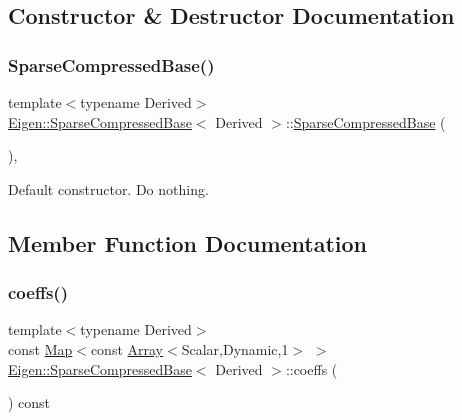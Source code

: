 \subsection{Constructor \& Destructor Documentation}
\mbox{\label{class_eigen_1_1_sparse_compressed_base_af79f020db965367d97eb954fc68d8f99}} 
\subsubsection{\texorpdfstring{SparseCompressedBase()}{SparseCompressedBase()}}
{\footnotesize\ttfamily template$<$typename Derived$>$ \\
\mbox{\hyperlink{class_eigen_1_1_sparse_compressed_base}{Eigen\+::\+Sparse\+Compressed\+Base}}$<$ Derived $>$\+::\mbox{\hyperlink{class_eigen_1_1_sparse_compressed_base}{Sparse\+Compressed\+Base}} (\begin{DoxyParamCaption}{ }\end{DoxyParamCaption})\hspace{0.3cm}{\ttfamily [inline]}, {\ttfamily [protected]}}

Default constructor. Do nothing. 

\subsection{Member Function Documentation}
\mbox{\label{class_eigen_1_1_sparse_compressed_base_a101b155485ae59ea1261c4f6040f3dc4}} 
\subsubsection{\texorpdfstring{coeffs()}{coeffs()}\hspace{0.1cm}{\footnotesize\ttfamily [1/2]}}
{\footnotesize\ttfamily template$<$typename Derived$>$ \\
const \mbox{\hyperlink{class_eigen_1_1_map}{Map}}$<$const \mbox{\hyperlink{class_eigen_1_1_array}{Array}}$<$Scalar,Dynamic,1$>$ $>$ \mbox{\hyperlink{class_eigen_1_1_sparse_compressed_base}{Eigen\+::\+Sparse\+Compressed\+Base}}$<$ Derived $>$\+::coeffs (\begin{DoxyParamCaption}{ }\end{DoxyParamCaption}) const\hspace{0.3cm}{\ttfamily [inline]}}

